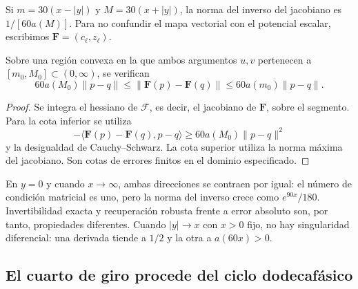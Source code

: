 Si \(m=30(x-|y|)\) y \(M=30(x+|y|)\), la norma del inverso del
jacobiano es \(1/[60a(M)]\). Para no confundir el mapa vectorial con
el potencial escalar, escribimos
\(\mathbf F=(c_\ell,z_\ell)\).

\begin{proposition}
\label{md:comp:prop-sensibilidad}
Sobre una región convexa en la que ambos argumentos \(u,v\) pertenecen
a \([m_0,M_0]\subset(0,\infty)\), se verifican
\begin{equation}
 60a(M_0)\|p-q\|
 \leq\|\mathbf F(p)-\mathbf F(q)\|
 \leq60a(m_0)\|p-q\|.
 \label{md:comp:cotas-finitas}
\end{equation}
\end{proposition}
\begin{proof}
Se integra el hessiano de \(\mathscr F\), es decir, el jacobiano
de \(\mathbf F\), sobre el segmento. Para la cota inferior se utiliza
\[
 -\langle\mathbf F(p)-\mathbf F(q),p-q\rangle
 \geq60a(M_0)\|p-q\|^2
\]
y la desigualdad de Cauchy--Schwarz. La cota superior utiliza la
norma máxima del jacobiano. Son cotas de errores finitos en el
dominio especificado.
\end{proof}

En \(y=0\) y cuando \(x\longrightarrow\infty\), ambas direcciones
se contraen por igual: el número de condición matricial es uno,
pero la norma del inverso crece como \(e^{90x}/180\).
Invertibilidad exacta y recuperación robusta frente a error absoluto
son, por tanto, propiedades diferentes. Cuando \(|y|\longrightarrow x\)
con \(x>0\) fijo, no hay singularidad diferencial: una derivada tiende
a \(1/2\) y la otra a \(a(60x)>0\).

\subsection{El cuarto de giro procede del ciclo dodecafásico}
\label{md:comp:cuarto-giro}

